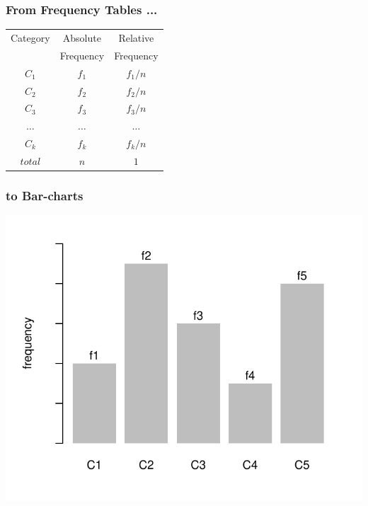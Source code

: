 \documentclass[12pt]{beamer}\usepackage[]{graphicx}\usepackage[]{color}
\newenvironment{knitrout}{}{} %
\begin{document}
\begin{frame}
\begin{center}
\Huge{}
\end{center}
\end{frame}


\begin{frame}
\frametitle{From Frequency Tables ...}

{\large
\begin{center}
 \begin{tabular}{c c c}
  \hline
  Category & Absolute & Relative \\
   & Frequency & Frequency \\
  \hline
  $C_1$ & $f_1$ & $f_1 / n$ \\
  $C_2$ & $f_2$ & $f_2 / n$ \\
  $C_3$ & $f_3$ & $f_3 / n$ \\
  $\dots$ & $\dots$ & $\dots$ \\
  $C_k$ & $f_k$ & $f_k / n$ \\
  \hline
  $total$ & $n$ & $1$ \\
 \end{tabular}
\end{center}
}

\end{frame}


\begin{frame}
\frametitle{to Bar-charts}

\begin{knitrout}\footnotesize
{}\color{fgcolor}

{\centering \includegraphics[width=.7\linewidth,height=.6\linewidth]{figure/unnamed-chunk-1-1} 

}



\end{knitrout}

\end{frame}
\end{document}
